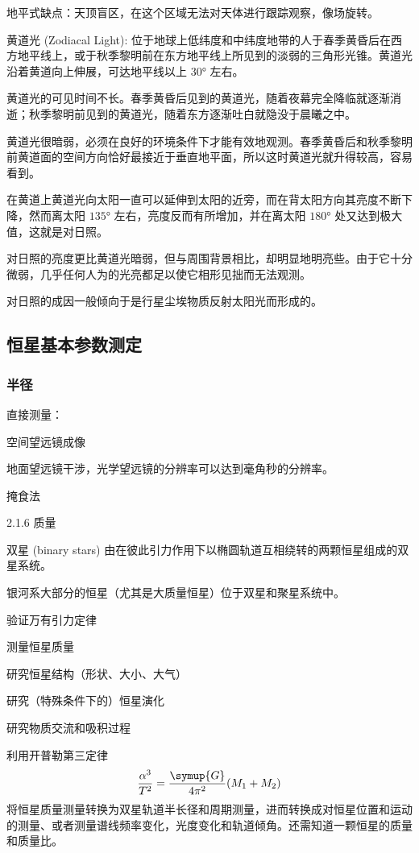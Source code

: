 \documentclass[UTF8, 12pt, a4paper, oneside, onecolumn, fontset=none]{ctexart}
\begin{document}
地平式缺点：天顶盲区，在这个区域无法对天体进行跟踪观察，像场旋转。

黄道光 (Zodiacal Light): 位于地球上低纬度和中纬度地带的人于春季黄昏后在西方地平线上，或于秋季黎明前在东方地平线上所见到的淡弱的三角形光锥。黄道光沿着黄道向上伸展，可达地平线以上 $\ang{30;;}$ 左右。

黄道光的可见时间不长。春季黄昏后见到的黄道光，随着夜幕完全降临就逐渐消逝；秋季黎明前见到的黄道光，随着东方逐渐吐白就隐没于晨曦之中。

黄道光很暗弱，必须在良好的环境条件下才能有效地观测。春季黄昏后和秋季黎明前黄道面的空间方向恰好最接近于垂直地平面，所以这时黄道光就升得较高，容易看到。

在黄道上黄道光向太阳一直可以延伸到太阳的近旁，而在背太阳方向其亮度不断下降，然而离太阳 $\ang{135;;}$ 左右，亮度反而有所增加，并在离太阳 $\ang{180;;}$ 处又达到极大值，这就是对日照。

对日照的亮度更比黄道光暗弱，但与周围背景相比，却明显地明亮些。由于它十分微弱，几乎任何人为的光亮都足以使它相形见拙而无法观测。

对日照的成因一般倾向于是行星尘埃物质反射太阳光而形成的。

\subsection{恒星基本参数测定}
\subsubsection{半径}

直接测量：

空间望远镜成像

地面望远镜干涉，光学望远镜的分辨率可以达到毫角秒的分辨率。

掩食法

2.1.6 质量

双星 (binary stars) 由在彼此引力作用下以椭圆轨道互相绕转的两颗恒星组成的双星系统。

银河系大部分的恒星（尤其是大质量恒星）位于双星和聚星系统中。

验证万有引力定律

测量恒星质量

研究恒星结构（形状、大小、大气）

研究（特殊条件下的）恒星演化

研究物质交流和吸积过程

利用开普勒第三定律
\begin{equation}
\frac{\alpha^{3}}{T^{2}}=\frac{\symup{G}}{4\pi^{2}}\mleft(M_{1}+M_{2}\mright)
\end{equation}
将恒星质量测量转换为双星轨道半长径和周期测量，进而转换成对恒星位置和运动的测量、或者测量谱线频率变化，光度变化和轨道倾角。还需知道一颗恒星的质量和质量比。
\end{document}

